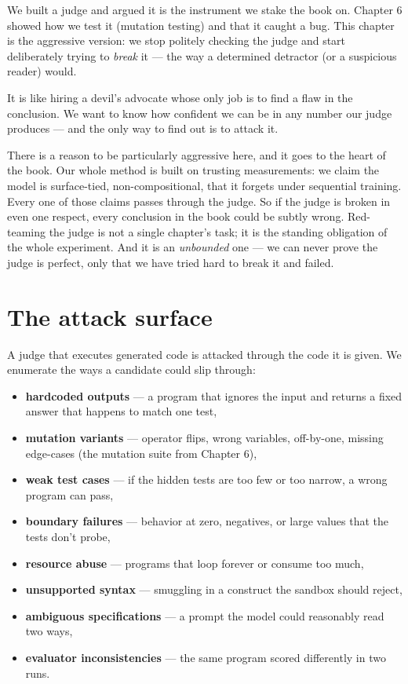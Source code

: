 We built a judge and argued it is the instrument we stake the book on.
Chapter 6 showed how we test it (mutation testing) and that it caught a
bug. This chapter is the aggressive version: we stop politely checking
the judge and start deliberately trying to \emph{break} it --- the way a
determined detractor (or a suspicious reader) would.

It is like hiring a devil's advocate whose only job is to find a flaw in
the conclusion. We want to know how confident we can be in any number
our judge produces --- and the only way to find out is to attack it.

There is a reason to be particularly aggressive here, and it goes to the
heart of the book. Our whole method is built on trusting measurements:
we claim the model is surface-tied, non-compositional, that it forgets
under sequential training. Every one of those claims passes through the
judge. So if the judge is broken in even one respect, every conclusion
in the book could be subtly wrong. Red-teaming the judge is not a single
chapter's task; it is the standing obligation of the whole experiment.
And it is an \emph{unbounded} one --- we can never prove the judge is
perfect, only that we have tried hard to break it and failed.

\section{The attack surface}\label{the-attack-surface}

A judge that executes generated code is attacked through the code it is
given. We enumerate the ways a candidate could slip through:

\begin{itemize}
\tightlist
\item
  \textbf{hardcoded outputs} --- a program that ignores the input and
  returns a fixed answer that happens to match one test,
\item
  \textbf{mutation variants} --- operator flips, wrong variables,
  off-by-one, missing edge-cases (the mutation suite from Chapter 6),
\item
  \textbf{weak test cases} --- if the hidden tests are too few or too
  narrow, a wrong program can pass,
\item
  \textbf{boundary failures} --- behavior at zero, negatives, or large
  values that the tests don't probe,
\item
  \textbf{resource abuse} --- programs that loop forever or consume too
  much,
\item
  \textbf{unsupported syntax} --- smuggling in a construct the sandbox
  should reject,
\item
  \textbf{ambiguous specifications} --- a prompt the model could
  reasonably read two ways,
\item
  \textbf{evaluator inconsistencies} --- the same program scored
  differently in two runs.
\end{itemize}

